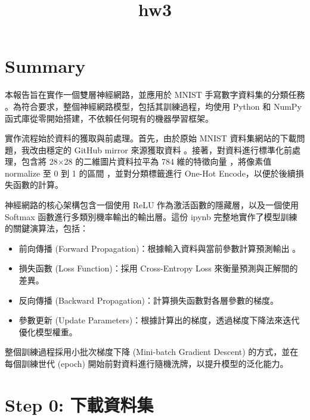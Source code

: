 \documentclass[11pt]{article}
\title{hw3}
\providecommand{\tightlist}{%
      \setlength{\itemsep}{0pt}\setlength{\parskip}{0pt}}
\begin{document}
    
    \maketitle
    
    

    
    \section{Summary}\label{summary}

本報告旨在實作一個雙層神經網路，並應用於 MNIST 手寫數字資料集的分類任務
。為符合要求，整個神經網路模型，包括其訓練過程，均使用 Python 和 NumPy
函式庫從零開始搭建，不依賴任何現有的機器學習框架。

實作流程始於資料的獲取與前處理。首先，由於原始 MNIST
資料集網站的下載問題，我改由穩定的 GitHub mirror 來源獲取資料
。接著，對資料進行標準化前處理，包含將 28×28 的二維圖片資料拉平為 784
維的特徵向量 ，將像素值 normalize 至 0 到 1 的區間 ，並對分類標籤進行
One-Hot Encode，以便於後續損失函數的計算。

神經網路的核心架構包含一個使用 ReLU 作為激活函數的隱藏層，以及一個使用
Softmax 函數進行多類別機率輸出的輸出層。這份 ipynb
完整地實作了模型訓練的關鍵演算法，包括：

\begin{itemize}
\tightlist
\item
  前向傳播 (Forward Propagation)：根據輸入資料與當前參數計算預測輸出 。
\item
  損失函數 (Loss Function)：採用 Cross-Entropy Loss
  來衡量預測與正解間的差異。
\item
  反向傳播 (Backward Propagation)：計算損失函數對各層參數的梯度。
\item
  參數更新 (Update
  Parameters)：根據計算出的梯度，透過梯度下降法來迭代優化模型權重。
\end{itemize}

整個訓練過程採用小批次梯度下降 (Mini-batch Gradient Descent)
的方式，並在每個訓練世代 (epoch)
開始前對資料進行隨機洗牌，以提升模型的泛化能力。

    \section{Step 0:
下載資料集}\label{step-0-ux4e0bux8f09ux8cc7ux6599ux96c6}
\end{document}

